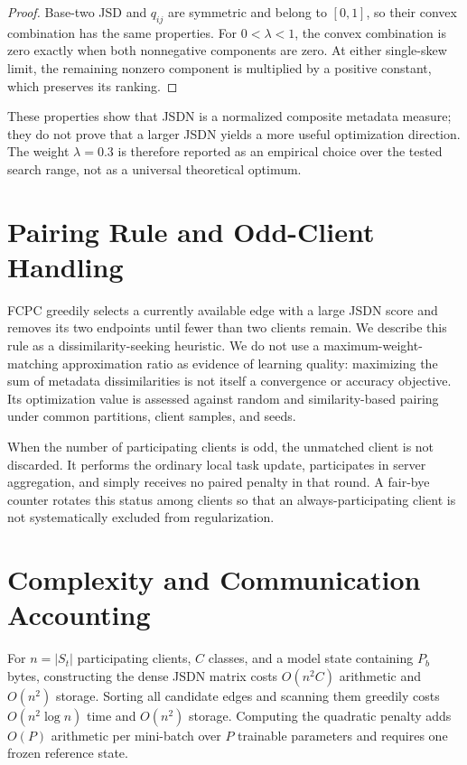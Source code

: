 \documentclass[journal,twoside,web]{ieeecolor}
\begin{document}
\begin{proof}
Base-two JSD and $q_{ij}$ are symmetric and belong to $[0,1]$, so their convex
combination has the same properties. For $0<\lambda<1$, the convex
combination is zero exactly when both nonnegative components are zero. At
either single-skew limit, the remaining nonzero component is multiplied by a
positive constant, which preserves its ranking.
\end{proof}

These properties show that JSDN is a normalized composite metadata measure;
they do not prove that a larger JSDN yields a more useful optimization
direction. The weight $\lambda=0.3$ is therefore reported as an empirical
choice over the tested search range, not as a universal theoretical optimum.

\section{Pairing Rule and Odd-Client Handling}

FCPC greedily selects a currently available edge with a large JSDN score and
removes its two endpoints until fewer than two clients remain. We describe
this rule as a dissimilarity-seeking heuristic. We do not use a
maximum-weight-matching approximation ratio as evidence of learning quality:
maximizing the sum of metadata dissimilarities is not itself a convergence or
accuracy objective. Its optimization value is assessed against random and
similarity-based pairing under common partitions, client samples, and seeds.

When the number of participating clients is odd, the unmatched client is not
discarded. It performs the ordinary local task update, participates in server
aggregation, and simply receives no paired penalty in that round. A fair-bye
counter rotates this status among clients so that an always-participating
client is not systematically excluded from regularization.

\section{Complexity and Communication Accounting}

For $n=|S_t|$ participating clients, $C$ classes, and a model state containing
$P_b$ bytes, constructing the dense JSDN matrix costs $O(n^2C)$ arithmetic and
$O(n^2)$ storage. Sorting all candidate edges and scanning them greedily
costs $O(n^2\log n)$ time and $O(n^2)$ storage. Computing the quadratic
penalty adds $O(P)$ arithmetic per mini-batch over $P$ trainable parameters
and requires one frozen reference state.
\end{document}
